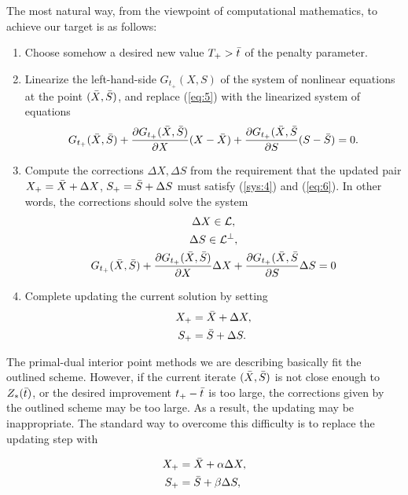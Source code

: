 \documentclass[11pt,a4paper]{article}
\begin{document}
The most natural way, from the viewpoint of computational mathematics, to achieve our target is as follows:
\begin{enumerate}
    \item Choose somehow a desired new value $T_+ > \Bar{t}$ of the penalty parameter.
    \item Linearize the left-hand-side $G_{t_+}(X,S)$ of the system of nonlinear equations at the point $(\Bar{X}, \Bar{S})$, and replace (\ref{eq:5}) with the linearized system of equations
    \begin{equation}\label{eq:6}
        G_{t_+}(\Bar{X},\Bar{S})+\frac{\partial G_{t_+}(\Bar{X},\Bar{S})}{\partial X}(X-\Bar{X})+\frac{\partial G_{t_+}(\Bar{X}, \Bar{S}}{\partial S}(S-\Bar{S}) = 0.
    \end{equation}
    \item Compute the corrections $\Delta X, \Delta S$ from the requirement that the updated pair $X_+ = \Bar{X}+\Delta X$, $S_+ = \Bar{S}+\Delta S$ must satisfy (\ref{sys:4}) and (\ref{eq:6}). In other words, the corrections should solve the system
    \begin{gather*}
        \Delta X \in \mathcal{L},\\
        \Delta S \in \mathcal{L}^\perp,\\
        G_{t_+}(\Bar{X},\Bar{S})+\frac{\partial G_{t_+}(\Bar{X},\Bar{S})}{\partial X}\Delta X+\frac{\partial G_{t_+}(\Bar{X}, \Bar{S}}{\partial S}\Delta S = 0
    \end{gather*}
    \item Complete updating the current solution by setting
    \begin{align*}
        X_+ &= \Bar{X}+\Delta X,\\
        S_+ &= \Bar{S}+\Delta S.
    \end{align*}
\end{enumerate}

The primal-dual interior point methods we are describing basically fit the outlined
scheme. However, if the current iterate $(\Bar{X},\Bar{S})$ is not close enough to $Z_*(\Bar{t})$, or the desired improvement $t_+-\Bar{t}$ is too large, the corrections given by the outlined scheme may be too large. As a result, the updating may be inappropriate. The standard way to overcome this difficulty is to replace the updating step with

\begin{align}
    X_+ &= \Bar{X}+\alpha \Delta X,\\
    S_+ &= \Bar{S}+\beta \Delta S,
\end{align}
\end{document}
